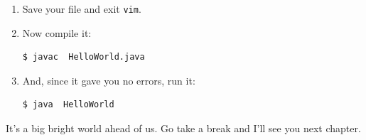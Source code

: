 \begin{enumerate}
\item Save your file and exit \texttt{vim}.

\item Now compile it:
\begin{Verbatim}[fontsize=\small]
$ javac  HelloWorld.java
\end{Verbatim}

\item And, since it gave you no errors, run it:
\begin{Verbatim}[fontsize=\small]
$ java  HelloWorld
\end{Verbatim}

\end{enumerate}

It's a big bright world ahead of us. Go take a break and I'll see you next
chapter.
